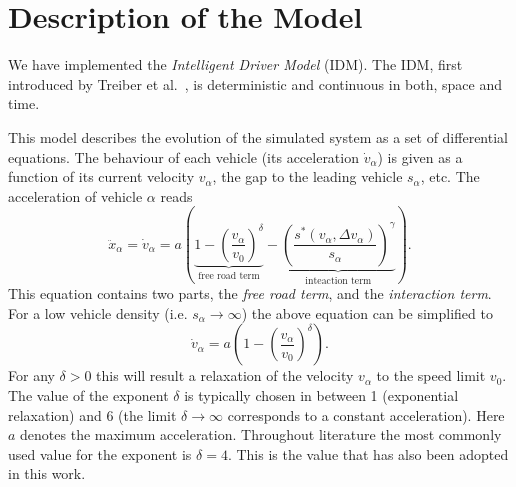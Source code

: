 \section{Description of the Model}
\label{sec:model}
We have implemented the \emph{Intelligent Driver Model} (IDM). The IDM, first introduced by Treiber et al.\ \cite{treiber1999, treiber2000}, is deterministic and continuous in both, space and time.

This model describes the evolution of the simulated system as a set of differential equations. The behaviour of each vehicle (its acceleration $\dot{v}_\alpha$) is given as a function of its current velocity $v_\alpha$, the gap to the leading vehicle $s_\alpha$, etc.
The acceleration of vehicle $\alpha$ reads 
\begin{equation}
\ddot x_\alpha = \dot v_\alpha = a\left(\underbrace{1-\left(\frac{v_\alpha}{v_0}\right)^\delta}_{\text{free road term}} - \underbrace{\left(\frac{s^*(v_\alpha, \Delta v_\alpha)}{s_\alpha}\right)^\gamma}_{\text{inteaction term}}\right).
\label{eq:IDM}
\end{equation}
This equation contains two parts, the \emph{free road term}, and the \emph{interaction term}. For a low vehicle density (i.e. $s_\alpha \rightarrow \infty$) the above equation can be simplified to
\begin{equation}
\dot v_\alpha = a\left(1-\left(\frac{v_\alpha}{v_0}\right)^\delta\right).
\end{equation}
For any $\delta>0$ this will result a relaxation of the velocity $v_\alpha$ to the speed limit $v_0$. The value of the exponent $\delta$ is typically chosen in between 1 (exponential relaxation) and 6 (the limit $\delta\rightarrow \infty$ corresponds to a constant acceleration). Here $a$ denotes the maximum acceleration. Throughout literature the most commonly used value for the exponent is $\delta=4$. This is the value that has also been adopted in this work.

